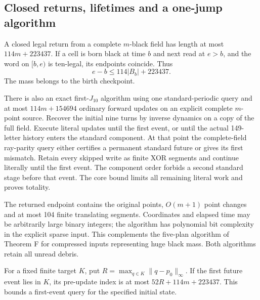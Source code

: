 \subsection{Closed returns, lifetimes and a one-jump algorithm}
A closed legal return from a complete $m$-black field has length at most
$114m+223437$. If a cell is born black at time $b$ and next read at $e>b$,
and the word on $[b,e)$ is ten-legal, its endpoints coincide. Thus
\[
 e-b\le114|B_b|+223437.
\]
The mass belongs to the birth checkpoint.

There is also an exact first-$J_{10}$ algorithm using one standard-periodic
query and at most $114m+154694$ ordinary forward updates on an explicit
complete $m$-point source. Recover the initial nine turns by inverse dynamics
on a copy of the full field. Execute literal updates until the first event,
or until the actual 149-letter history enters the standard component.
At that point the complete-field ray-parity query either certifies a
permanent standard future or gives its first mismatch. Retain every skipped
write as finite XOR segments and continue literally until the first event.
The component order forbids a second standard stage before that event.
The core bound limits all remaining literal work and proves totality.

The returned endpoint contains the original points, $O(m+1)$ point changes
and at most 104 finite translating segments. Coordinates and elapsed time
may be arbitrarily large binary integers; the algorithm has polynomial bit
complexity in the explicit sparse input. This complements the five-plan algorithm of Theorem F for compressed inputs representing huge
black mass. Both algorithms retain all unread debris.

For a fixed finite target $K$, put
$R=\max_{q\in K}\|q-p_0\|_\infty$. If the first future event lies in $K$,
its pre-update index is at most $52R+114m+223437$. This bounds a first-event
query for the specified initial state.
